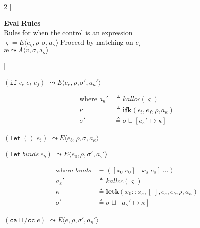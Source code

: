 \documentclass[12pt,draft]{article}
\newcommand\mae{\ensuremath{\text{\ae}}}
\newcommand{\ifsyn}[3]{(\texttt{if}\;#1\;#2\;#3)}
\newcommand{\callccsyn}[1]{(\texttt{call/cc}\;#1)}
\newcommand{\ctrl}[0]{e_{\varsigma}}
\newcommand{\env}[0]{\rho}
\newcommand{\store}[0]{\sigma}
\newcommand{\kaddr}[0]{a_{\kappa}}
\newcommand{\kont}[0]{\kappa}
\newcommand{\state}[0]{\varsigma}
\newcommand{\E}[4]{E\langle #1 , #2 , #3 , #4 \rangle}
\newcommand{\A}[3]{A\langle #1 , #2 , #3 \rangle}
\begin{document}
\footnotesize{
\begin{multicols*}{2}
[
\begin{center}
\textbf{Eval Rules} \\
Rules for when the control is an expression \\
\vspace{2mm}
$\state = \E{\ctrl}{\env}{\store}{\kaddr}$
Proceed by matching on $\ctrl$ \\
\vspace{3mm}
$\mae \leadsto \A{v}{\store}{\kaddr}$
\end{center}
]
\begin{center}
  $\ifsyn{e_c}{e_t}{e_f}$
  $\leadsto \E{e_c}{\env}{\store'}{\kaddr'}$
\end{center}
\vspace{-7mm}
\begin{align*}
  \text{where }
  \kaddr' &\triangleq kalloc(\state) \\
  \kont &\triangleq \textbf{ifk}(e_t , e_f , \env , \kaddr) \\
  \store' &\triangleq \store \sqcup [\kaddr' \mapsto \kont]
\end{align*}
\begin{center}
  $(\texttt{let}\;()\;e_b)$
  $\leadsto \E{e_b}{\env}{\store}{\kaddr}$
\end{center}
\vspace{-5mm}
\begin{center}
  $(\texttt{let}\;binds\;e_b)$
  $\leadsto \E{e_0}{\env}{\store'}{\kaddr'}$
\end{center}
\vspace{-7mm}
\begin{align*}
  \text{where }
  binds &= ([x_0\;e_0]\;[x_s\;e_s]\;...) \\
  \kaddr' &\triangleq kalloc(\state) \\
  \kont &\triangleq \textbf{letk}(x_0::x_s , [\;] , e_s , e_b , \env , \kaddr) \\
  \store' &\triangleq \store \sqcup [\kaddr' \mapsto \kont]
\end{align*}
\begin{center}
  $\callccsyn{e}$
  $\leadsto \E{e}{\env}{\store'}{\kaddr'}$
\end{center}

\end{multicols*}}
\end{document}
